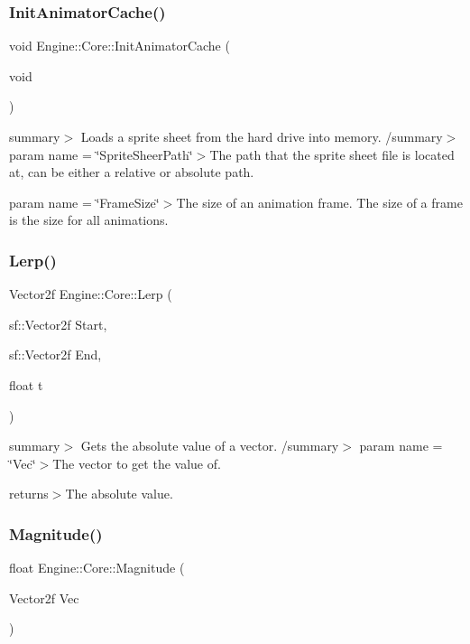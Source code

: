 \subsubsection{\texorpdfstring{Init\+Animator\+Cache()}{InitAnimatorCache()}}
{\footnotesize\ttfamily void Engine\+::\+Core\+::\+Init\+Animator\+Cache (\begin{DoxyParamCaption}\item[{void}]{ }\end{DoxyParamCaption})}

summary$>$ Loads a sprite sheet from the hard drive into memory. /summary$>$ param name = \char`\"{}\+Sprite\+Sheer\+Path\char`\"{}$>$The path that the sprite sheet file is located at, can be either a relative or absolute path.

param name = \char`\"{}\+Frame\+Size\char`\"{}$>$The size of an animation frame. The size of a frame is the size for all animations.\mbox{\label{namespace_engine_1_1_core_a98107ac0730234291d51fea94ff04ce1}} 
\subsubsection{\texorpdfstring{Lerp()}{Lerp()}}
{\footnotesize\ttfamily Vector2f Engine\+::\+Core\+::\+Lerp (\begin{DoxyParamCaption}\item[{sf\+::\+Vector2f}]{Start,  }\item[{sf\+::\+Vector2f}]{End,  }\item[{float}]{t }\end{DoxyParamCaption})}

summary$>$ Gets the absolute value of a vector. /summary$>$ param name = \char`\"{}\+Vec\char`\"{}$>$The vector to get the value of.

returns$>$The absolute value.\mbox{\label{namespace_engine_1_1_core_a81febf5a36b0440b0e1cf7b3116113ec}} 
\subsubsection{\texorpdfstring{Magnitude()}{Magnitude()}}
{\footnotesize\ttfamily float Engine\+::\+Core\+::\+Magnitude (\begin{DoxyParamCaption}\item[{Vector2f}]{Vec }\end{DoxyParamCaption})}



